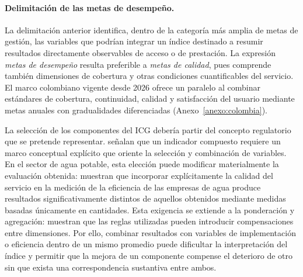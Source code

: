 \paragraph{Delimitación de las metas de desempeño.}

La delimitación anterior identifica, dentro de la categoría más amplia de metas de gestión, las variables que podrían integrar un índice destinado a resumir resultados directamente observables de acceso o de prestación. La expresión \emph{metas de desempeño} resulta preferible a \emph{metas de calidad}, pues comprende también dimensiones de cobertura y otras condiciones cuantificables del servicio. El marco colombiano vigente desde 2026 ofrece un paralelo al combinar estándares de cobertura, continuidad, calidad y satisfacción del usuario mediante metas anuales con gradualidades diferenciadas (Anexo~\ref{anexo:colombia}).

La selección de los componentes del ICG debería partir del concepto regulatorio que se pretende representar. \citet{OECD2008CompositeIndicators} señalan que un indicador compuesto requiere un marco conceptual explícito que oriente la selección y combinación de variables. En el sector de agua potable, esta elección puede modificar materialmente la evaluación obtenida: \citet{PicazoTadeo2008Quality} muestran que incorporar explícitamente la calidad del servicio en la medición de la eficiencia de las empresas de agua produce resultados significativamente distintos de aquellos obtenidos mediante medidas basadas únicamente en cantidades. Esta exigencia se extiende a la ponderación y agregación: \citet{greco2019methodological} muestran que las reglas utilizadas pueden introducir compensaciones entre dimensiones. Por ello, combinar resultados con variables de implementación o eficiencia dentro de un mismo promedio puede dificultar la interpretación del índice y permitir que la mejora de un componente compense el deterioro de otro sin que exista una correspondencia sustantiva entre ambos.

